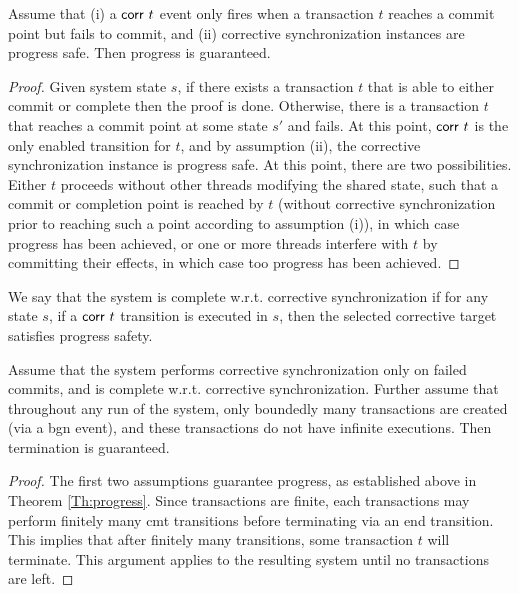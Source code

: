 \begin{theorem}[Progress]\label{Th:progress} Assume that (i) a ${\sf corr}\ t$ event only fires when a transaction $t$ reaches a commit point but fails to commit, and (ii) corrective synchronization instances are progress safe. Then progress is guaranteed.
	\begin{proof}
	Given system state $s$, if there exists a transaction $t$ that is able to either commit or complete then the proof is done. Otherwise, there is a transaction $t$ that reaches a commit point at some state $s'$ and fails. At this point, ${\sf corr}\ t$ is the only enabled transition for $t$, and by assumption (ii), the corrective synchronization instance is progress safe. At this point, there are two possibilities. Either $t$ proceeds without other threads modifying the shared state, such that a commit or completion point is reached by $t$ (without corrective synchronization prior to reaching such a point according to assumption (i)), in which case progress has been achieved, or one or more threads interfere with $t$ by committing their effects, in which case too progress has been achieved.
	\end{proof}
\end{theorem}

\begin{definition} 
	We say that the system is complete w.r.t. corrective synchronization if for any state $s$, if a ${\sf corr}\ t$ transition is executed in $s$, then the selected corrective target satisfies progress safety.
\end{definition}

\begin{lemma}[Termination]
	Assume that the system performs corrective synchronization only on failed commits, and is complete w.r.t. corrective synchronization. Further assume that throughout any run of the system, only boundedly many transactions are created (via a {\sf bgn} event), and these transactions do not have infinite executions. Then termination is guaranteed. \vspace{3pt}
	\begin{proof}
		The first two assumptions guarantee progress, as established above in 
		Theorem \ref{Th:progress}. Since transactions are finite, each transactions may perform finitely many {\sf cmt} transitions before terminating via an {\sf end} transition. This implies that after finitely many transitions, some transaction $t$ will terminate. This argument applies to the resulting system until no transactions are left.
	\end{proof}
\end{lemma}

